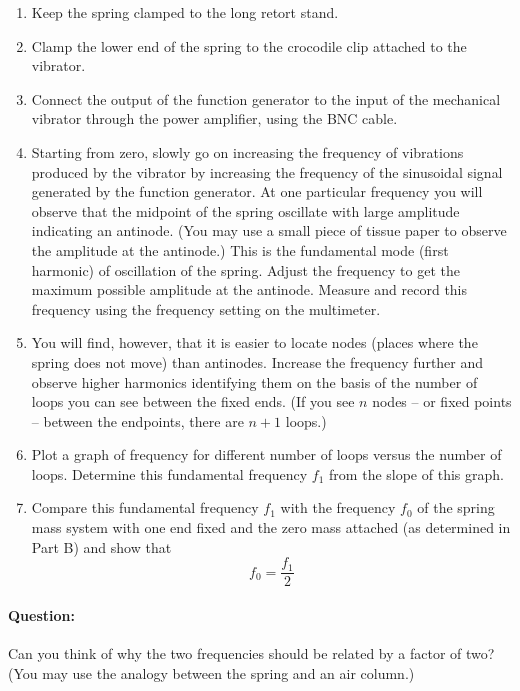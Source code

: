\begin{enumerate}
\item Keep the spring clamped to the long retort stand.

\item Clamp the lower end of the spring to the crocodile clip attached to the vibrator.

\item Connect the output of the function generator to the input of the mechanical vibrator
through the power amplifier, using the BNC cable.

\item Starting from zero, slowly go on increasing the frequency of vibrations produced by the vibrator by increasing the frequency of the sinusoidal signal generated by the function generator. At one particular frequency you will observe that the midpoint of the spring oscillate with large amplitude indicating an antinode. (You may use a small piece of tissue paper to observe the amplitude at the antinode.) This is the fundamental mode (first harmonic) of oscillation of the spring. Adjust the frequency to get the maximum possible amplitude at the antinode. Measure and record this frequency using the frequency setting on the multimeter.

\item You will find, however, that it is easier to locate nodes (places where the spring does not move) than antinodes. Increase the frequency further and observe higher harmonics identifying them on the basis of the number of loops you can see between the fixed ends. (If you see $n$ nodes -- or fixed points -- between the endpoints, there are $n+1$ loops.)

\item Plot a graph of frequency for different number of loops versus the number of loops. Determine this fundamental frequency $f_1$ from the slope of this graph.

\item Compare this fundamental frequency $f_1$ with the frequency $f_0$ of the spring mass
system with one end fixed and the zero mass attached (as determined in Part B) and
show that $$f_0 = \frac{f_1}{2}$$
\end{enumerate}

\begin{question}
\paragraph{Question:} Can you think of why the two frequencies should be related by a factor of two? (You may use the analogy between the spring and an air column.)
\end{question}


